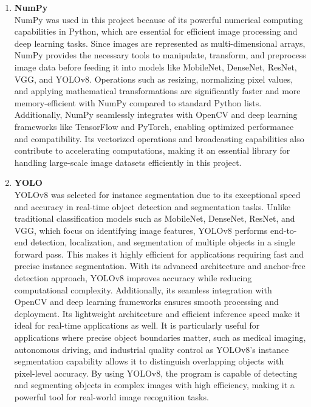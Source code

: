 \begin{enumerate}
	\item \textbf{NumPy} \\
	NumPy was used in this project because of its powerful numerical computing capabilities in Python, which are essential for efficient image processing and deep learning tasks. Since images are represented as multi-dimensional arrays, NumPy provides the necessary tools to manipulate, transform, and preprocess image data before feeding it into models like MobileNet, DenseNet, ResNet, VGG, and YOLOv8. Operations such as resizing, normalizing pixel values, and applying mathematical transformations are significantly faster and more memory-efficient with NumPy compared to standard Python lists. Additionally, NumPy seamlessly integrates with OpenCV and deep learning frameworks like TensorFlow and PyTorch, enabling optimized performance and compatibility. Its vectorized operations and broadcasting capabilities also contribute to accelerating computations, making it an essential library for handling large-scale image datasets efficiently in this project.
	
	\item \textbf{YOLO} \\
	YOLOv8 was selected for instance segmentation due to its exceptional speed and accuracy in real-time object detection and segmentation tasks. Unlike traditional classification models such as MobileNet, DenseNet, ResNet, and VGG, which focus on identifying image features, YOLOv8 performs end-to-end detection, localization, and segmentation of multiple objects in a single forward pass. This makes it highly efficient for applications requiring fast and precise instance segmentation. With its advanced architecture and anchor-free detection approach, YOLOv8 improves accuracy while reducing computational complexity. Additionally, its seamless integration with OpenCV and deep learning frameworks ensures smooth processing and deployment. Its lightweight architecture and efficient inference speed make it ideal for real-time applications as well. It is particularly useful for applications where precise object boundaries matter, such as medical imaging, autonomous driving, and industrial quality control as YOLOv8's instance segmentation capability allows it to distinguish overlapping objects with pixel-level accuracy.  By using YOLOv8, the program is capable of detecting and segmenting objects in complex images with high efficiency, making it a powerful tool for real-world image recognition tasks.
	

\end{enumerate}
